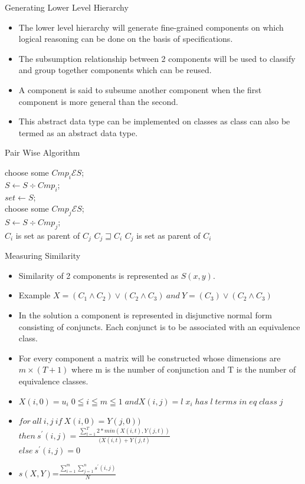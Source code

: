 \documentclass{beamer}
\begin{document}
\begin{frame}[allowframebreaks]{Generating Lower Level Hierarchy}
	\begin{itemize}
		\item The lower level hierarchy will generate fine-grained components on which logical reasoning can be done on the basis of specifications.
		\item The subsumption relationship between 2 components will be used to classify and group together components which can be reused.
		\item A component is said to subsume another component when the first component is more general than the second.
		\item This abstract data type can be implemented on classes as class can also be termed as an abstract data type.
	\end{itemize}
\begin{algorithm}[H]
	\caption{Pair Wise Algorithm}
	{
		choose some $Cmp_i \mathcal{E}  S $;\\
		$S \leftarrow S\div Cmp_i$;\\
		$set \leftarrow S$;\\
		{
			choose some $Cmp_j \mathcal{E}  S $;\\
			$S \leftarrow S\div Cmp_j$;\\
			{$C_i$ is set as parent of $C_j$ }
			\ElseIf
			{$C_j \sqsupseteq C_i$}
			{$C_j$ is set as parent of $C_i$}
		}
		
	}
\end{algorithm}
\end{frame}
\begin{frame}{Measuring Similarity}
\begin{itemize}
	\item Similarity of 2 components is represented as \(S(x,y)\).
	\item Example \(X=(C_1 \wedge C_2)\vee(C_2 \wedge C_3)\ and \ Y=(C_3)\vee(C_2 \wedge C_3)\)
	\item In the solution a component is represented in disjunctive normal form consisting of conjuncts. Each conjunct is to be associated
	with an equivalence class.
	\item For every component a matrix will be constructed whose dimensions are \(m \times (T+1)\) where m is the number of conjunction and T is the number of equivalence classes.
	\item 
		\(X(i,0) = u_i\;  0 \leqq i \leqq m \leqq 1\;
		and 
		X(i,j) = l\;  x_i\;has\;l\;terms\;in\;eq\;class\;j
		\)
	\item 	\(
	for\ all\ i,j\ if\ X(i,0)=Y(j,0)
	)\
	\)
	\\
	\(
	then\ s^{'} (i,j)=\frac{\sum_{t=1}^{T}2*min(X(i,t),Y(j,t))}{(X(i,t)+Y(j,t)}\)
	\\
	\(else\ s^{'}(i,j)=0
	\)
	\item 	\(s(X,Y)\)=$\frac{\sum_{i=1}^{m}\sum_{j=1}^{n}s^{'}(i,j)}{N}$
\end{itemize}
\end{frame}
\end{document}

